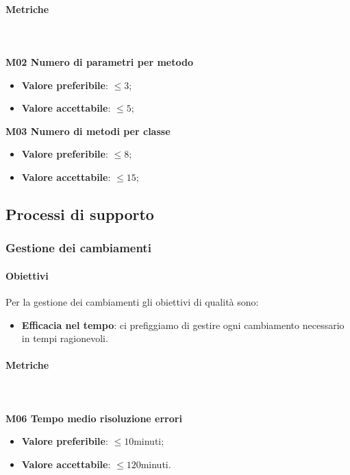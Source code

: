 			\paragraph{Metriche} \mbox{} \\ \\
			\textbf{M02 Numero di parametri per metodo} 
			\begin{itemize}
				\item \textbf{Valore preferibile}: $ \le 3$;
				\item \textbf{Valore accettabile}: $ \le 5$;
			\end{itemize}			
			\textbf{M03 Numero di metodi per classe} 
			\begin{itemize}
				\item \textbf{Valore preferibile}: $ \le 8$;
				\item \textbf{Valore accettabile}: $ \le 15$;
			\end{itemize}
	
			
	\subsection{Processi di supporto}
		\subsubsection{Gestione dei cambiamenti}
			\paragraph{Obiettivi}
			Per la gestione dei cambiamenti gli obiettivi di qualità sono:
			\begin{itemize}
				\item \textbf{Efficacia nel tempo}: ci prefiggiamo di gestire ogni cambiamento necessario in tempi ragionevoli.
			\end{itemize}
			\paragraph{Metriche} \mbox{} \\ \\
			\textbf{M06 Tempo medio risoluzione errori}
			\begin{itemize}
				\item \textbf{Valore preferibile}: $\le 10$minuti;
				\item \textbf{Valore accettabile}: $\le 120$minuti.
			\end{itemize}			
